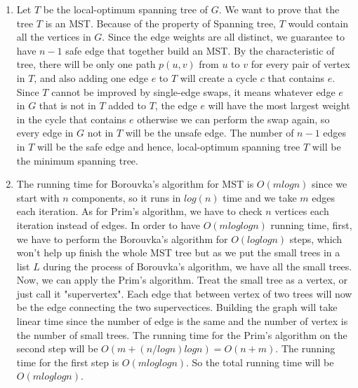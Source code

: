 \documentclass[11pt]{article}
\begin{document}
\begin{solution}
$$  $$
\begin{enumerate}
    \item  
       Let $T$ be the local-optimum spanning tree of $G$. We want to prove that the tree $T$ is an MST. Because of the property of Spanning tree, $T$ would contain all the vertices in $G$. Since the edge weights are all distinct, we guarantee to have $n-1$ safe edge that together build an MST. By the  characteristic of tree, there will be only one path $p(u,v)$ from $u$ to $v$ for every pair of vertex in $T$, and also adding one edge $e$ to $T$ will create a cycle $c$ that contains $e$. Since $T$ cannot be improved by single-edge swaps, it means whatever edge $e$ in $G$ that is not in $T$ added to $T$, the edge $e$ will have the most largest weight in the cycle that contains $e$ otherwise we can perform the swap again, so every edge in $G$ not in $T$ will be the unsafe edge. The number of $n-1$ edges in $T$ will be the safe edge and hence, local-optimum spanning tree $T$ will be the minimum spanning tree.
    \item
       The running time for Borouvka's algorithm for MST is $O(mlogn)$ since we start with $n$ components, so it runs in $log(n)$ time and we take $m$ edges each iteration. As for Prim's algorithm, we have to check $n$ vertices each iteration instead of edges. In order to have $O(mloglogn)$ running time, first, we have to perform the Borouvka's algorithm for $O(loglogn)$ steps, which won't help up finish the whole MST tree but as we put the small trees in a list $L$ during the process of Borouvka's algorithm, we have all the small trees. Now, we can apply the Prim's algorithm. Treat the small tree as a vertex, or just call it "supervertex". Each edge that between vertex of two trees will now be the edge connecting the two supervectices. Building the graph will take linear time since the number of edge is the same and the number of vertex is the number of small trees. The running time for the Prim's algorithm on the second step will be $O(m+(n/logn)logn) = O(n+m)$. The running time for the first step is $O(mloglogn)$. So the total running time will be $O(mloglogn)$. 
\end{enumerate}
\end{solution}
\end{document}
